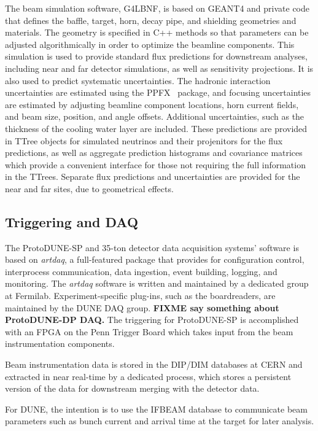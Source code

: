 The beam simulation software, G4LBNF, is based on GEANT4 and private code that defines the baffle, target, horn,
decay pipe, and shielding geometries and materials.  The geometry is specified in C++ methods so that parameters
can be adjusted algorithmically in order to optimize the beamline components.  This simulation is used to provide
standard flux predictions for downstream analyses, including near and far detector simulations, as well as
sensitivity projections.  It is also used to predict systematic uncertainties.  The hadronic interaction uncertainties
are estimated using the PPFX~\cite{ppfx} package, and focusing uncertainties are estimated by adjusting 
beamline component locations, horn current fields, and beam size, position, and angle offsets.  Additional
uncertainties, such as the thickness of the cooling water layer are included.  These predictions are provided
in TTree objects for simulated neutrinos and their projenitors for the flux predictions, as well as aggregate
prediction histograms and covariance matrices which provide a convenient interface for those not requiring the
full information in the TTrees.  Separate flux predictions and uncertainties are provided for the near and far
sites, due to geometrical effects.

\subsection{Triggering and DAQ}

The ProtoDUNE-SP and 35-ton detector data acquisition systems'
software is based on {\it artdaq}, a full-featured package that provides
for configuration control, interprocess communication, data ingestion, event building, logging, and monitoring.
The {\it artdaq} software is written and maintained by a dedicated group at Fermilab.  Experiment-specific plug-ins,
such as the boardreaders, are maintained by the DUNE DAQ group.  {\bf FIXME say something about ProtoDUNE-DP DAQ.}
The triggering for ProtoDUNE-SP is accomplished with an FPGA on the Penn Trigger Board which takes input from
the beam instrumentation components. 

Beam instrumentation data is stored in the DIP/DIM databases at CERN and extracted in near real-time by a dedicated
process, which stores a persistent version of the data for downstream merging with the detector data.

For DUNE, the intention is to use the IFBEAM database to communicate beam parameters such as bunch current
and arrival time at the target for later analysis.

